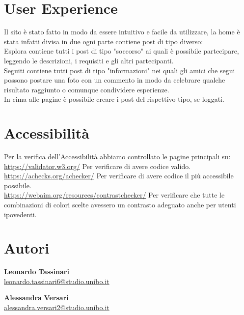 \section{User Experience}
Il sito è stato fatto in modo da essere intuitivo e facile da utilizzare, la home è stata infatti divisa in due ogni parte contiene post di tipo diverso:\\
Esplora contiene tutti i post di tipo "soccorso" ai quali è possibile partecipare, leggendo le descrizioni, i requisiti e gli altri partecipanti.\\
Seguiti contiene tutti post di tipo "informazioni" nei quali gli amici che segui possono postare una foto con un commento in modo da celebrare qualche risultato raggiunto o comunque condividere esperienze.\\
In cima alle pagine è possibile creare i post del rispettivo tipo, se loggati.
\section{Accessibilità}
Per la verifica dell'Accessibilità abbiamo controllato le pagine principali su:\\
\href{https://validator.w3.org/}{https://validator.w3.org/} Per verificare di avere codice valido.\\
\href{https://achecks.org/achecker/}{https://achecks.org/achecker/} Per verificare di avere codice il più accessibile possibile.\\
\href{https://webaim.org/resources/contrastchecker/}{https://webaim.org/resources/contrastchecker/} Per verificare che tutte le combinazioni di colori scelte avessero un contrasto adeguato anche per utenti ipovedenti.
\section{Autori}
\begin{minipage}[t]{0.4\textwidth}
    \textbf{Leonardo} \textbf{Tassinari}\\
    \href{mailto:leonardo.tassinari6@studio.unibo.it}{leonardo.tassinari6@studio.unibo.it}
\end{minipage}%
\hfill
\begin{minipage}[t]{0.3\textwidth}
\end{minipage}
\begin{minipage}[t]{0.4\textwidth}
    \textbf{Alessandra} \textbf{Versari}\\
    \href{mailto:alessandra.versari2@studio.unibo.it}{alessandra.versari2@studio.unibo.it}
\end{minipage}%
\hfill
\begin{minipage}[t]{0.3\textwidth}
\end{minipage}
